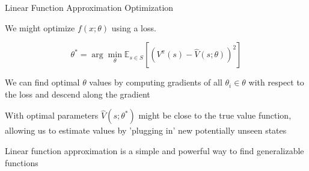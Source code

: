 \begin{frame}[t]{Linear Function Approximation Optimization}

We might optimize $f(x; \theta)$ using a  loss.

\[
\theta^* = \arg \min_\theta \mathbb{E}_{s \in S}\left[(V^\pi (s) - \hat{V}(s; \theta))^2 \right]
\]

\blist
    \item<2-> We can find optimal $\theta$ values by computing gradients of all $\theta_i \in \theta$ with respect to the loss and descend along the gradient
\elist
{}
\blist
    \item<3-> With optimal parameters $\hat{V}(s; \theta^*)$ might be close to the true value function, allowing us to estimate values by 'plugging in' new potentially unseen states
    \item<4-> Linear function approximation is a simple and powerful way to find generalizable functions
\elist

\end{frame}


